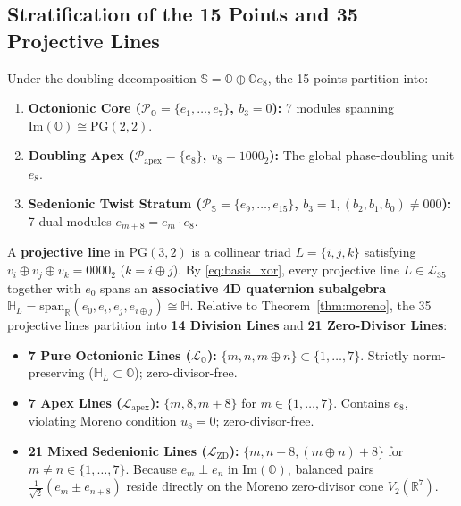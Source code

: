 \documentclass[11pt,a4paper]{article}
\theoremstyle{definition}
\theoremstyle{remark}
\newcommand{\R}{\mathbb{R}}
\newcommand{\Ha}{\mathbb{H}}
\newcommand{\Oc}{\mathbb{O}}
\newcommand{\Se}{\mathbb{S}}
\newcommand{\PG}{\mathrm{PG}}
\newcommand{\ImPart}{\mathrm{Im}}
\begin{document}
\subsection{Stratification of the 15 Points and 35 Projective Lines}
Under the doubling decomposition $\Se = \Oc \oplus \Oc e_8$, the 15 points partition into:
\begin{enumerate}
    \item \textbf{Octonionic Core ($\mathcal{P}_{\Oc} = \{e_1, \dots, e_7\}$, $b_3 = 0$):} 7 modules spanning $\ImPart(\Oc) \cong \PG(2,2)$.
    \item \textbf{Doubling Apex ($\mathcal{P}_{\mathrm{apex}} = \{e_8\}$, $v_8 = 1000_2$):} The global phase-doubling unit $e_8$.
    \item \textbf{Sedenionic Twist Stratum ($\mathcal{P}_{\Se} = \{e_9, \dots, e_{15}\}$, $b_3 = 1, (b_2, b_1, b_0) \neq 000$):} 7 dual modules $e_{m+8} = e_m \cdot e_8$.
\end{enumerate}
A \textbf{projective line} in $\PG(3,2)$ is a collinear triad $L = \{i, j, k\}$ satisfying $v_i \oplus v_j \oplus v_k = 0000_2$ ($k = i \oplus j$). By \eqref{eq:basis_xor}, every projective line $L \in \mathcal{L}_{35}$ together with $e_0$ spans an \textbf{associative 4D quaternion subalgebra} $\Ha_L = \mathrm{span}_{\R}(e_0, e_i, e_j, e_{i \oplus j}) \cong \Ha$. Relative to Theorem~\ref{thm:moreno}, the 35 projective lines partition into \textbf{14 Division Lines} and \textbf{21 Zero-Divisor Lines}:
\begin{itemize}
    \item \textbf{7 Pure Octonionic Lines ($\mathcal{L}_{\Oc}$):} $\{m, n, m \oplus n\} \subset \{1, \dots, 7\}$. Strictly norm-preserving ($\Ha_L \subset \Oc$); zero-divisor-free.
    \item \textbf{7 Apex Lines ($\mathcal{L}_{\mathrm{apex}}$):} $\{m, 8, m+8\}$ for $m \in \{1, \dots, 7\}$. Contains $e_8$, violating Moreno condition $u_8 = 0$; zero-divisor-free.
    \item \textbf{21 Mixed Sedenionic Lines ($\mathcal{L}_{\mathrm{ZD}}$):} $\{m, n+8, (m \oplus n)+8\}$ for $m \neq n \in \{1, \dots, 7\}$. Because $e_m \perp e_n$ in $\ImPart(\Oc)$, balanced pairs $\frac{1}{\sqrt{2}}(e_m \pm e_{n+8})$ reside directly on the Moreno zero-divisor cone $V_2(\R^7)$.
\end{itemize}
\end{document}
